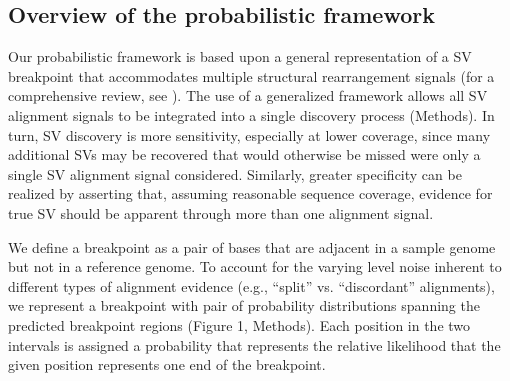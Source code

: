 \documentclass[11pt]{article}
\begin{document}
\subsection{Overview of the probabilistic framework}

Our probabilistic framework is based upon a general representation of a SV 
breakpoint that accommodates multiple structural rearrangement signals (for a 
comprehensive review, see \cite{alkan2011}). The use of a generalized framework
allows all SV alignment signals to be integrated into a single discovery
process (Methods). In turn, SV discovery is more sensitivity, 
especially at lower coverage, since many additional SVs may be recovered that 
would otherwise be missed were only a single SV alignment signal considered. 
Similarly, greater specificity can be realized by asserting that, assuming 
reasonable sequence coverage, evidence for true SV should be apparent through 
more than one alignment signal.

We define a breakpoint as a pair of bases that are adjacent in a sample genome 
but not in a reference genome.  To account for the varying level noise inherent 
to different types of alignment evidence (e.g., ``split'' vs. ``discordant'' 
alignments), we represent a breakpoint with pair of probability distributions
spanning the predicted breakpoint regions (Figure 1, Methods).  Each position 
in the two intervals is assigned a probability that represents the relative 
likelihood that the given position represents one end of the breakpoint. 

\end{document}
